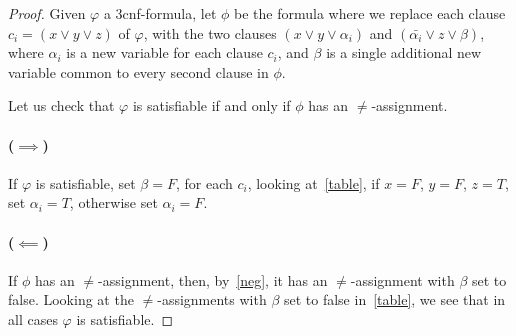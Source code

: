 \documentclass{article}
\begin{document}
\begin{proof}
  Given $\varphi$ a 3cnf-formula, let $\phi$ be the formula where we replace
  each clause $c_i = (x \lor y \lor z)$ of $\varphi$, with the two clauses $(x
  \lor y \lor \alpha_i)$ and $(\bar{\alpha_i} \lor z \lor \beta)$, where $\alpha_i$ is a
  new variable for each clause $c_i$, and $\beta$ is a single additional new
  variable common to every second clause in $\phi$.

  Let us check that $\varphi$ is satisfiable if and only if $\phi$ has an
  $\ne$-assignment.

  \paragraph{($\implies$)} If $\varphi$ is satisfiable, set $\beta=F$, for each
  $c_i$, looking at~\ref{table}, if $x=F$, $y=F$, $z=T$, set $\alpha_i=T$,
  otherwise set $\alpha_i=F$.

  \paragraph{($\impliedby$)}
  If $\phi$ has an $\ne$-assignment, then, by~\ref{neg}, it has an
  $\ne$-assignment with $\beta$ set to false. Looking at the $\ne$-assignments
  with $\beta$ set to false in~\ref{table}, we see that in all cases $\varphi$
  is satisfiable.


\end{proof}
\end{document}
